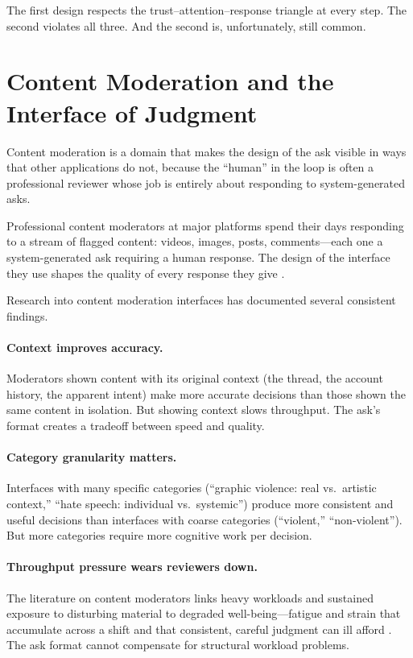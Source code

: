 The first design respects the trust--attention--response triangle at every step. The second violates all three. And the second is, unfortunately, still common.

\section{Content Moderation and the Interface of Judgment}
\label{sec:ch05-content-moderation}

Content moderation is a domain that makes the design of the ask visible in ways that other \hitl applications do not, because the ``human'' in the loop is often a professional reviewer whose job is entirely about responding to system-generated asks.

Professional content moderators at major platforms spend their days responding to a stream of flagged content: videos, images, posts, comments---each one a system-generated ask requiring a human response. The design of the interface they use shapes the quality of every response they give \autocite{roberts2019behind}.

Research into content moderation interfaces has documented several consistent findings.

\paragraph{Context improves accuracy.} Moderators shown content with its original context (the thread, the account history, the apparent intent) make more accurate decisions than those shown the same content in isolation. But showing context slows throughput. The ask's format creates a tradeoff between speed and quality.

\paragraph{Category granularity matters.} Interfaces with many specific categories (``graphic violence: real vs.\ artistic context,'' ``hate speech: individual vs.\ systemic'') produce more consistent and useful decisions than interfaces with coarse categories (``violent,'' ``non-violent''). But more categories require more cognitive work per decision.

\paragraph{Throughput pressure wears reviewers down.} The literature on content moderators links heavy workloads and sustained exposure to disturbing material to degraded well-being---fatigue and strain that accumulate across a shift and that consistent, careful judgment can ill afford \autocite{steiger2021psychological}. The ask format cannot compensate for structural workload problems.

